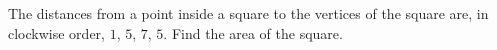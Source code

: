 The distances from a point inside a square to the vertices of the square are, in clockwise order, $1$, $5$, $7$, $5$. Find the area of the square.
